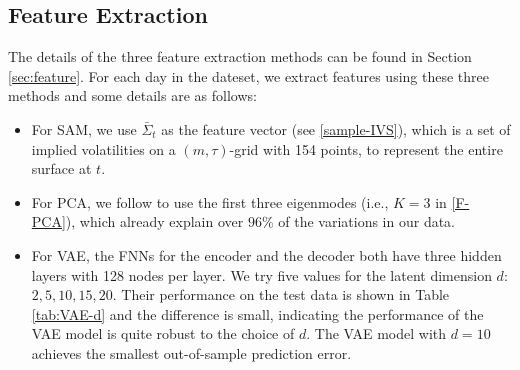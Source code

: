 \documentclass[11pt,a4paper]{article}
\theoremstyle{remark}
\begin{document}
\subsection{Feature Extraction}
The details of the three feature extraction methods can be found in Section \ref{sec:feature}. For each day in the dateset, we extract features using these three methods and some details are as follows:
\begin{itemize}
	\item For SAM, we use $\bar{\Sigma}_t$ as the feature vector (see \eqref{sample-IVS}), which is a set of implied volatilities on a $(m,\tau)$-grid with 154 points, to represent the entire surface at $t$.   
	
	\item For PCA, we follow \cite{cont2002dynamics} to use the first three eigenmodes (i.e., $K=3$ in \eqref{F-PCA}), which already explain over $96\%$ of the variations in our data.  
	
	\item For VAE, the FNNs for the encoder and the decoder both have three hidden layers with 128 nodes per layer. We try five values for the latent dimension $d$: $2, 5, 10, 15, 20$. Their performance on the test data is shown in Table \ref{tab:VAE-d} and the difference is small, indicating the performance of the VAE model is quite robust to the choice of $d$. The VAE model with $d = 10$ achieves the smallest out-of-sample prediction error.  
\end{itemize}
\end{document}
